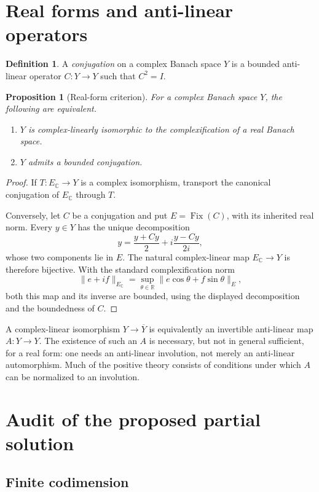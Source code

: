 \documentclass[11pt]{article}
\newtheorem{proposition}[theorem]{Proposition}
\theoremstyle{definition}
\newtheorem{definition}[theorem]{Definition}
\theoremstyle{remark}
\newcommand{\C}{\mathbb C}
\newcommand{\R}{\mathbb R}
\newcommand{\Fix}{\operatorname{Fix}}
\begin{document}
\section{Real forms and anti-linear operators}

\begin{definition}
A \emph{conjugation} on a complex Banach space $Y$ is a bounded anti-linear operator $C:Y\to Y$ such that $C^2=I$.
\end{definition}

\begin{proposition}[Real-form criterion]\label{prop:real-form-criterion}
For a complex Banach space $Y$, the following are equivalent.
\begin{enumerate}[label=(\roman*)]
\item $Y$ is complex-linearly isomorphic to the complexification of a real Banach space.
\item $Y$ admits a bounded conjugation.
\end{enumerate}
\end{proposition}

\begin{proof}
If $T:E_{\C}\to Y$ is a complex isomorphism, transport the canonical conjugation of $E_{\C}$ through $T$.

Conversely, let $C$ be a conjugation and put $E=\Fix(C)$, with its inherited real norm. Every $y\in Y$ has the unique decomposition
\[
 y=\frac{y+Cy}{2}+i\frac{y-Cy}{2i},
\]
whose two components lie in $E$. The natural complex-linear map $E_{\C}\to Y$ is therefore bijective. With the standard complexification norm
\[
 \|e+if\|_{E_{\C}}=\sup_{\theta\in\R}\|e\cos\theta+f\sin\theta\|_E,
\]
both this map and its inverse are bounded, using the displayed decomposition and the boundedness of $C$.
\end{proof}

A complex-linear isomorphism $Y\to\overline{Y}$ is equivalently an invertible anti-linear map $A:Y\to Y$. The existence of such an $A$ is necessary, but not in general sufficient, for a real form: one needs an anti-linear involution, not merely an anti-linear automorphism. Much of the positive theory consists of conditions under which $A$ can be normalized to an involution.

\section{Audit of the proposed partial solution}

\subsection{Finite codimension}
\end{document}
